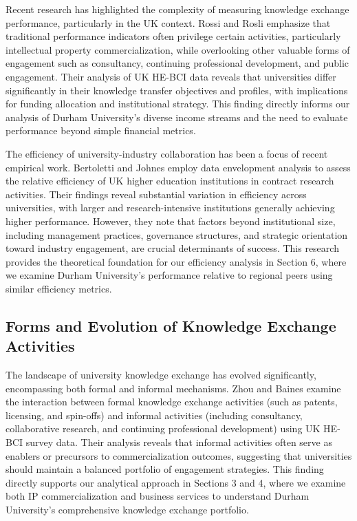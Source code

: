 \documentclass[journal,onecolumn, 10pt,draftclsnofoot]{IEEEtran}
\begin{document}
Recent research has highlighted the complexity of measuring knowledge exchange performance, particularly in the UK context. Rossi and Rosli \cite{rossi2015indicators} emphasize that traditional performance indicators often privilege certain activities, particularly intellectual property commercialization, while overlooking other valuable forms of engagement such as consultancy, continuing professional development, and public engagement. Their analysis of UK HE-BCI data reveals that universities differ significantly in their knowledge transfer objectives and profiles, with implications for funding allocation and institutional strategy. This finding directly informs our analysis of Durham University's diverse income streams and the need to evaluate performance beyond simple financial metrics.

The efficiency of university-industry collaboration has been a focus of recent empirical work. Bertoletti and Johnes \cite{bertoletti2021efficiency} employ data envelopment analysis to assess the relative efficiency of UK higher education institutions in contract research activities. Their findings reveal substantial variation in efficiency across universities, with larger and research-intensive institutions generally achieving higher performance. However, they note that factors beyond institutional size, including management practices, governance structures, and strategic orientation toward industry engagement, are crucial determinants of success. This research provides the theoretical foundation for our efficiency analysis in Section 6, where we examine Durham University's performance relative to regional peers using similar efficiency metrics.

\subsection{Forms and Evolution of Knowledge Exchange Activities}

The landscape of university knowledge exchange has evolved significantly, encompassing both formal and informal mechanisms. Zhou and Baines \cite{zhou2024extent} examine the interaction between formal knowledge exchange activities (such as patents, licensing, and spin-offs) and informal activities (including consultancy, collaborative research, and continuing professional development) using UK HE-BCI survey data. Their analysis reveals that informal activities often serve as enablers or precursors to commercialization outcomes, suggesting that universities should maintain a balanced portfolio of engagement strategies. This finding directly supports our analytical approach in Sections 3 and 4, where we examine both IP commercialization and business services to understand Durham University's comprehensive knowledge exchange portfolio.
\end{document}
